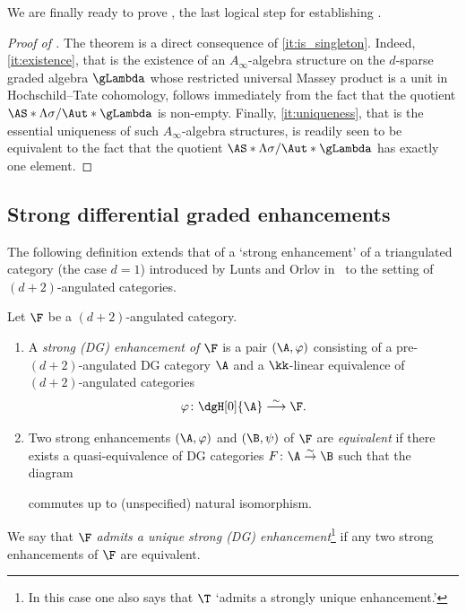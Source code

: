 \documentclass[a4paper]{amsart}
\begin{document}
We are finally ready to prove , the last logical step
for establishing .

\begin{proof}[Proof of ] The theorem is a direct
  consequence of \eqref{it:is_singleton}. Indeed,
  \eqref{it:existence}, that is the existence of an
  $A_\infty$-algebra structure on the $d$-sparse graded algebra $\gLambda$ whose
  restricted universal Massey product is a unit in Hochschild--Tate cohomology,
  follows immediately from the fact that the quotient
  $\AS*{\Lambda}{\sigma}/\Aut*{\gLambda}$ is non-empty. Finally,
  \eqref{it:uniqueness}, that is the essential
  uniqueness of such $A_\infty$-algebra structures, is readily seen to be
  equivalent to the fact that the quotient
  $\AS*{\Lambda}{\sigma}/\Aut*{\gLambda}$ has exactly one element.
\end{proof}

\subsection{Strong differential graded enhancements}
\label{subsec:strong}

The following definition extends that of a `strong enhancement' of a
triangulated category (the case $d=1$) introduced by Lunts and Orlov
in~\cite{LO10} to the setting of $(d+2)$-angulated categories.

\begin{definition}
  \label{def:strong}
  Let $\F$ be a $(d+2)$-angulated category.
  \begin{enumerate}
  \item A \emph{strong (DG) enhancement of $\F$}
    is a pair $(\A,\varphi)$ consisting of a pre-$(d+2)$-angulated DG category $\A$ and a 
    $\kk$-linear equivalence of $(d+2)$-angulated categories
    \[
      \varphi\colon\dgH[0]{\A}\stackrel{\sim}{\longrightarrow}\F.
    \]
  \item\label{it:strong_equivalence}  Two strong enhancements $(\A,\varphi)$ and $(\B,\psi)$ of $\F$ are
    \emph{equivalent} if there exists a quasi-equivalence of DG categories
    $F\colon\A\stackrel{\sim}{\to}\B$ such that the diagram
    \begin{center}
    \end{center}
    commutes up to (unspecified) natural isomorphism.
  \end{enumerate}
  We say that $\F$ \emph{admits a unique strong (DG)
    enhancement}\footnote{In this case one also says that $\T$ `admits a strongly unique enhancement.'} if any two
  strong enhancements of $\F$ are equivalent.
\end{definition}
\end{document}
